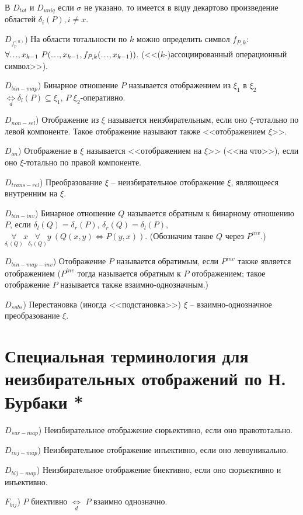 \documentclass[a4paper]{article}
\newcommand\mydots{\hbox to 1em{.\hss.\hss.}}
\newcommand{\Def}[0]{\underset{d}{\Leftrightarrow}}
\begin{document}
В $D_{tot}$ и $D_{uniq}$ если $\sigma$ не указано, то имеется в виду декартово произведение областей $\delta_i(P), i \neq x$.

$D_{f_p^{(n)}}$) На области тотальности по $k$ можно определить символ $f_{P,k}$: $\forall \mydots, x_{k-1}~P(\mydots, x_{k-1}, f_{P,k}(\mydots, x_{k-1}))$. (<<($k$-)ассоциированный операционный символ>>).

$D_{bin-map}$) Бинарное отношение $P$ называется отображением из $\xi_1$ в $\xi_2$ $\Def \delta_l(P) \subseteq \xi_1$, $P$ $\xi_2$-оперативно.

$D_{non-sel}$) Отображение из $\xi$ называется неизбирательным, если оно $\xi$-тотально по левой компоненте. Такое отображение называют также <<отображением $\xi$>>.

$D_{on}$) Отображение в $\xi$ называется <<отображением на $\xi$>> (<<на что>>), если оно $\xi$-тотально по правой компоненте.

$D_{trans-rel}$) Преобразование $\xi$ -- неизбирательное отображение $\xi$, являющееся внутренним на $\xi$.

$D_{bin-inv}$) Бинарное отношение $Q$ называется обратным к бинарному отношению $P$, если $\delta_l(Q) = \delta_r(P)$, $\delta_r(Q) = \delta_l(P)$, $\underset{\delta_l(Q)}{\forall} x \underset{\delta_r(Q)}{\forall} y~(Q(x, y) \Leftrightarrow P(y, x))$. (Обозначим такое $Q$ через $P^{inv}$.)

$D_{bin-map-inv}$) Отображение $P$ называется обратимым, если $P^{inv}$ также является отображением ($P^{inv}$ тогда называется обратным к $P$ отображением; такое отображение $P$ называется также взаимно-однозначным.)

$D_{subs}$) Перестановка (иногда <<подстановка>>) $\xi$ -- взаимно-однозначное преобразование $\xi$.

\section{Специальная терминология для неизбирательных отображений по Н. Бурбаки *}

$D_{sur-map}$) Неизбирательное отображение сюрьективно, если оно правототально.

$D_{inj-map}$) Неизбирательное отображение инъективно, если оно левоуникально.

$D_{bij-map}$) Неизбирательное отображение биективно, если оно сюрьективно и инъективно.

$F_{bij}$) $P$ биективно $\Def$ $P$ взаимно однозначно.
\end{document}
